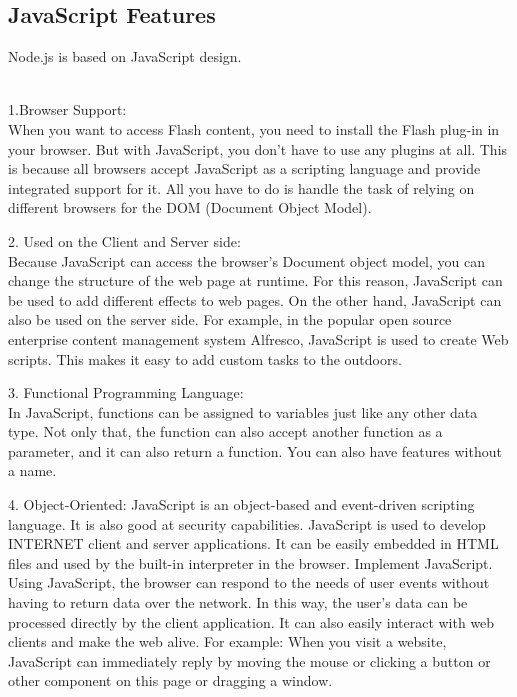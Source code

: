 \subsection{JavaScript Features}
\item Node.js is based on JavaScript design. \\ \\
\item 1.Browser Support: \\ When you want to access Flash content, you need to install the Flash plug-in in your browser. But with JavaScript, you don't have to use any plugins at all. This is because all browsers accept JavaScript as a scripting language and provide integrated support for it. All you have to do is handle the task of relying on different browsers for the DOM (Document Object Model). \\ 
\item 2. Used on the Client and Server side: \\ Because JavaScript can access the browser's Document object model, you can change the structure of the web page at runtime. For this reason, JavaScript can be used to add different effects to web pages. On the other hand, JavaScript can also be used on the server side. For example, in the popular open source enterprise content management system Alfresco, JavaScript is used to create Web scripts. This makes it easy to add custom tasks to the outdoors. \\ 
\item 3. Functional Programming Language: \\  In JavaScript, functions can be assigned to variables just like any other data type. Not only that, the function can also accept another function as a parameter, and it can also return a function. You can also have features without a name. \\ 
\item 4. Object-Oriented: JavaScript is an object-based and event-driven scripting language. It is also good at security capabilities. JavaScript is used to develop INTERNET client and server applications. It can be easily embedded in HTML files and used by the built-in interpreter in the browser. Implement JavaScript. Using JavaScript, the browser can respond to the needs of user events without having to return data over the network. In this way, the user's data can be processed directly by the client application. It can also easily interact with web clients and make the web alive. For example: When you visit a website, JavaScript can immediately reply by moving the mouse or clicking a button or other component on this page or dragging a window.
